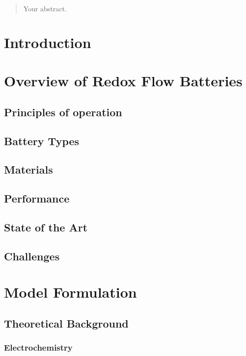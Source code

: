 \begin{abstract}
Your abstract.
\end{abstract}

\thispagestyle{empty}
\tableofcontents
\newpage


\setcounter{page}{1}


\section{Introduction}
\section{Overview of Redox Flow Batteries}

\subsection{Principles of operation}
\subsection{Battery Types}
\subsection{Materials}
\subsection{Performance}
\subsection{State of the Art}
\subsection{Challenges}

\section{Model Formulation}
\subsection{Theoretical Background}
\subsubsection{Electrochemistry}
